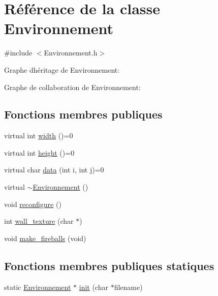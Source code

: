 \hypertarget{classEnvironnement}{}\section{Référence de la classe Environnement}
\label{classEnvironnement}


{\ttfamily \#include $<$Environnement.\+h$>$}



Graphe d\textquotesingle{}héritage de Environnement\+:


Graphe de collaboration de Environnement\+:
\subsection*{Fonctions membres publiques}
\begin{DoxyCompactItemize}
\item 
virtual int \hyperlink{classEnvironnement_a9f5945b3cde5bd2b0d46250446989081}{width} ()=0
\item 
virtual int \hyperlink{classEnvironnement_af7629ab7f15ec65476eadcc80c46b50c}{height} ()=0
\item 
virtual char \hyperlink{classEnvironnement_a0fae4716da729dbf13f52f09f2d293cd}{data} (int i, int j)=0
\item 
virtual \hyperlink{classEnvironnement_a6754a865157f3f38e8243ed3cbe63993}{$\sim$\+Environnement} ()
\item 
void \hyperlink{classEnvironnement_ae0d41172775150add2e20ff9a5d94943}{reconfigure} ()
\item 
int \hyperlink{classEnvironnement_a3e4f0241c8241d00161697b9ff167970}{wall\+\_\+texture} (char $\ast$)
\item 
void \hyperlink{classEnvironnement_a4d16b604c6ab4cdcc3d20a6045f18c45}{make\+\_\+fireballs} (void)
\end{DoxyCompactItemize}
\subsection*{Fonctions membres publiques statiques}
\begin{DoxyCompactItemize}
\item 
static \hyperlink{classEnvironnement}{Environnement} $\ast$ \hyperlink{classEnvironnement_a10f6862db4b62690c262a4aea0837cf7}{init} (char $\ast$filename)
\end{DoxyCompactItemize}
